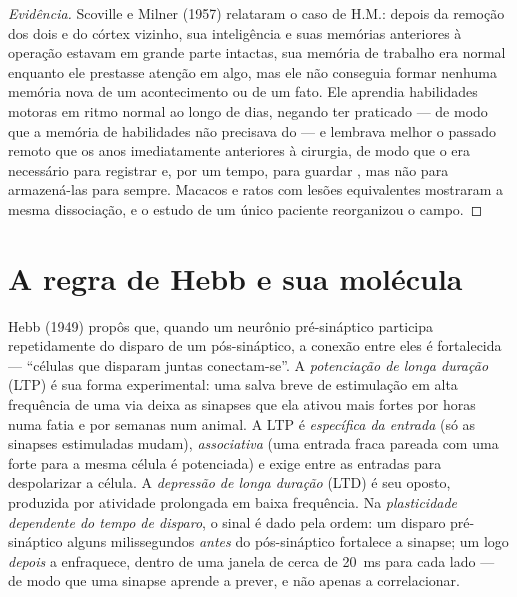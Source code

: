 \begin{proof}[Evidência]
Scoville e Milner (1957) relataram o caso de H.M.: depois da remoção dos
dois  e do córtex vizinho, sua inteligência e suas memórias
anteriores à operação estavam em grande parte intactas, sua memória de
trabalho era normal enquanto ele prestasse atenção em algo, mas ele não
conseguia formar nenhuma memória nova de um acontecimento ou de um fato.
Ele aprendia habilidades motoras em ritmo normal ao longo de dias,
negando ter praticado --- de modo que a memória de habilidades não
precisava do  --- e lembrava melhor o passado remoto que os
anos imediatamente anteriores à cirurgia, de modo que o  era
necessário para registrar e, por um tempo, para guardar , mas não para armazená-las para sempre. Macacos e ratos com
lesões equivalentes mostraram a mesma dissociação, e o estudo de um
único paciente reorganizou o campo.
\end{proof}

\section{A regra de Hebb e sua molécula}

\begin{definition}\label{def:b3:learning-memory:ltp}
Hebb (1949) propôs que, quando um neurônio pré-sináptico participa
repetidamente do disparo de um pós-sináptico, a conexão entre eles é
fortalecida --- ``células que disparam juntas conectam-se''. A
\emph{potenciação de longa duração} (LTP) é sua forma experimental: uma
salva breve de estimulação em alta frequência de uma via deixa as
sinapses que ela ativou mais fortes por horas numa fatia e por semanas
num animal. A LTP é \emph{específica da entrada} (só as sinapses
estimuladas mudam), \emph{associativa} (uma entrada fraca pareada com
uma forte para a mesma célula é potenciada) e exige
\emph{} entre as entradas para despolarizar a célula. A
\emph{depressão de longa duração} (LTD) é seu oposto, produzida por
atividade prolongada em baixa frequência. Na \emph{plasticidade
dependente do tempo de disparo}, o sinal é dado pela ordem: um disparo
pré-sináptico alguns milissegundos \emph{antes} do pós-sináptico
fortalece a sinapse; um logo \emph{depois} a enfraquece, dentro de uma
janela de cerca de \qty{20}{ms} para cada lado --- de modo que uma
sinapse aprende a prever, e não apenas a correlacionar.
\end{definition}

